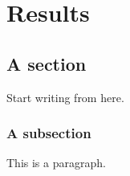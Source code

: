 \chapter{Results}
\section{A section}
Start writing from here.
\subsection{A subsection}
This is a paragraph.
